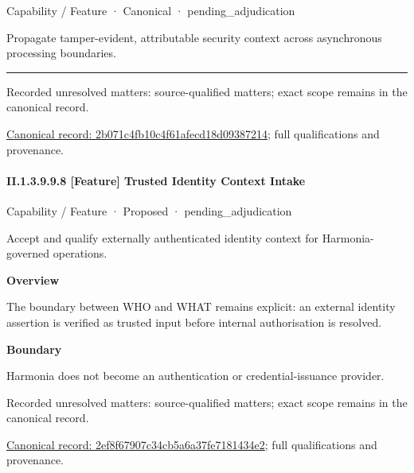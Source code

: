 \label{element:2b071c4fb10c4f61afecd18d09387214}
{\small Capability / Feature · Canonical · pending\_adjudication}\par

Propagate tamper-evident, attributable security context across asynchronous processing boundaries.



\medskip\hrule\medskip

{\small Recorded unresolved matters: source-qualified matters; exact scope remains in the canonical record.}\par
{\footnotesize \href{../../../../../../../continuum/strategy/capability/feature/2b071c4fb10c4f61afecd18d09387214.md}{Canonical record: 2b071c4fb10c4f61afecd18d09387214}; full qualifications and provenance.}\par
\paragraph*{II.1.3.9.9.8 [Feature] Trusted Identity Context Intake}
\label{navigation:II.1.3.9.9.8}

\label{element:2ef8f67907c34cb5a6a37fe7181434e2}
{\small Capability / Feature · Proposed · pending\_adjudication}\par

Accept and qualify externally authenticated identity context for Harmonia-governed operations.



\textbf{Overview}



The boundary between WHO and WHAT remains explicit: an external identity assertion is verified as trusted input before internal authorisation is resolved.



\textbf{Boundary}



Harmonia does not become an authentication or credential-issuance provider.


{\small Recorded unresolved matters: source-qualified matters; exact scope remains in the canonical record.}\par
{\footnotesize \href{../../../../../../../continuum/strategy/capability/feature/2ef8f67907c34cb5a6a37fe7181434e2.md}{Canonical record: 2ef8f67907c34cb5a6a37fe7181434e2}; full qualifications and provenance.}\par

